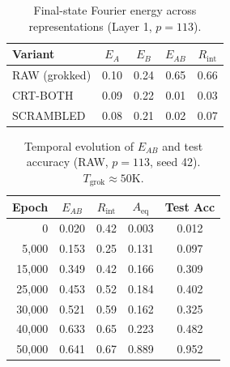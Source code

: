 \documentclass[11pt,a4paper]{article}
\theoremstyle{definition}
\theoremstyle{remark}
\newcommand{\EAB}{E_{AB}}
\newcommand{\EA}{E_A}
\newcommand{\EB}{E_B}
\newcommand{\Rint}{R_{\mathrm{int}}}
\newcommand{\Aeq}{A_{\mathrm{eq}}}
\begin{document}
\begin{table}[h]
\centering
\caption{Final-state Fourier energy across representations (Layer 1, $p=113$).}
\label{tab:fourier_final}
\begin{tabular}{lcccc}
\toprule
Variant & $\EA$ & $\EB$ & $\EAB$ & $\Rint$ \\
\midrule
RAW (grokked) & 0.10 & 0.24 & 0.65 & 0.66 \\
CRT-BOTH & 0.09 & 0.22 & 0.01 & 0.03 \\
SCRAMBLED & 0.08 & 0.21 & 0.02 & 0.07 \\
\bottomrule
\end{tabular}
\end{table}

\begin{table}[h]
\centering
\caption{Temporal evolution of $\EAB$ and test accuracy (RAW, $p=113$, seed 42). $T_{\mathrm{grok}} \approx 50$K.}
\label{tab:temporal}
\begin{tabular}{rcccc}
\toprule
Epoch & $\EAB$ & $\Rint$ & $\Aeq$ & Test Acc \\
\midrule
0 & 0.020 & 0.42 & 0.003 & 0.012 \\
5,000 & 0.153 & 0.25 & 0.131 & 0.097 \\
15,000 & 0.349 & 0.42 & 0.166 & 0.309 \\
25,000 & 0.453 & 0.52 & 0.184 & 0.402 \\
30,000 & 0.521 & 0.59 & 0.162 & 0.325 \\
40,000 & 0.633 & 0.65 & 0.223 & 0.482 \\
50,000 & 0.641 & 0.67 & 0.889 & 0.952 \\
\bottomrule
\end{tabular}
\end{table}
\end{document}
